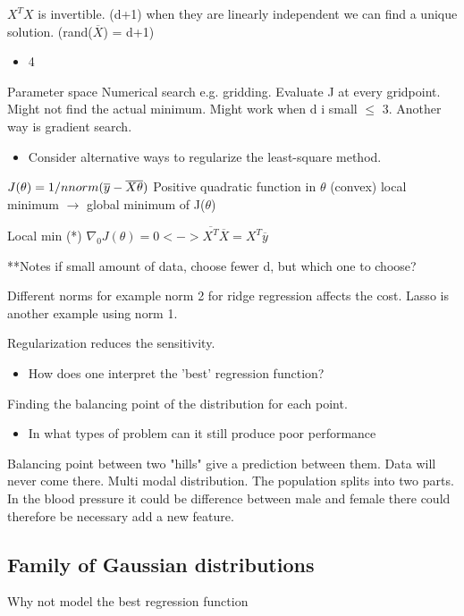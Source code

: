 $X^{T}X$ is invertible. (d+1) when they are linearly independent we can find a unique solution. (rand($\overline{X}$) = d+1)

\begin{itemize}
	\item 4
\end{itemize}
Parameter space 
Numerical search e.g. gridding. Evaluate J at every gridpoint. Might not find the actual minimum. Might work when d i small $\le$ 3. Another way is gradient search. 

\begin{itemize}
	\item Consider alternative ways to regularize the least-square method.
\end{itemize}
$J(\theta) = 1/n norm( \overline{y} - \overline{X} \overline{\theta}) \\$
Positive quadratic function in $\theta$ (convex)
local minimum $\rightarrow$ global minimum of J($\theta$) 


Local min (*) $\nabla_0 J(\theta) = 0 <-> \overline{X^T} \overline{X} = X^{T} \overline{y} $


**Notes if small amount of data, choose fewer d, but which one to choose? 


Different norms for example norm 2 for ridge regression affects the cost. 
Lasso is another example using norm 1. 


Regularization reduces the sensitivity. 


\begin{itemize}
  	\item How does one interpret the 'best' regression function?
  \end{itemize}  

Finding the balancing point of the distribution for each point. 


\begin{itemize}
	\item In what types of problem can it still produce poor performance
\end{itemize}

Balancing point between two "hills" give a prediction between them. Data will never come there. Multi modal distribution. The population splits into two parts. In the blood pressure it could be difference between male and female there could therefore be necessary add a new feature. 


\subsection*{Family of Gaussian distributions}
Why not model the best regression function

